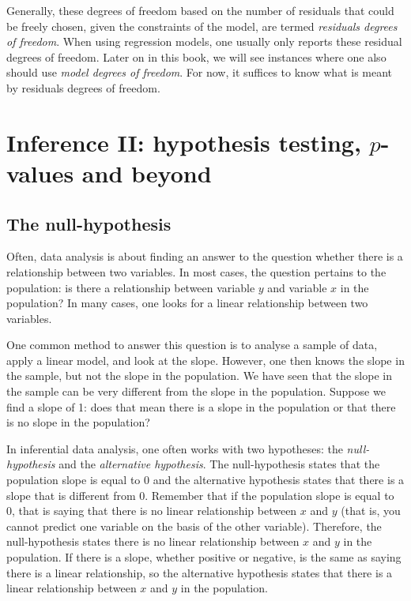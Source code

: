 \documentclass[]{report}\usepackage[]{graphicx}\usepackage[]{color}
\begin{document}
Generally, these degrees of freedom based on the number of residuals that could be freely chosen, given the constraints of the model, are termed \textit{residuals degrees of freedom}. When using regression models, one usually only reports these residual degrees of freedom. Later on in this book, we will see instances where one also should use \textit{model degrees of freedom}. For now, it suffices to know what is meant by residuals degrees of freedom.





\chapter{Inference II: hypothesis testing, $p$-values and beyond}

\section{The null-hypothesis}

Often, data analysis is about finding an answer to the question whether there is a relationship between two variables. In most cases, the question pertains to the population: is there a relationship between variable $y$ and variable $x$ in the population? In many cases, one looks for a linear relationship between two variables.

One common method to answer this question is to analyse a sample of data, apply a linear model, and look at the slope. However, one then knows the slope in the sample, but not the slope in the population. We have seen that the slope in the sample can be very different from the slope in the population. Suppose we find a slope of 1: does that mean there is a slope in the population or that there is no slope in the population?

In inferential data analysis, one often works with two hypotheses: the \textit{null-hypothesis} and the \textit{alternative hypothesis}. The null-hypothesis states that the population slope is equal to 0 and the alternative hypothesis states that there is a slope that is different from 0. Remember that if the population slope is equal to 0, that is saying that there is no linear relationship between $x$ and $y$ (that is, you cannot predict one variable on the basis of the other variable). Therefore, the null-hypothesis states there is no linear relationship between $x$ and $y$ in the population. If there is a slope, whether positive or negative, is the same as saying there is a linear relationship, so the alternative hypothesis states that there is a linear relationship between $x$ and $y$ in the population.
\end{document}
